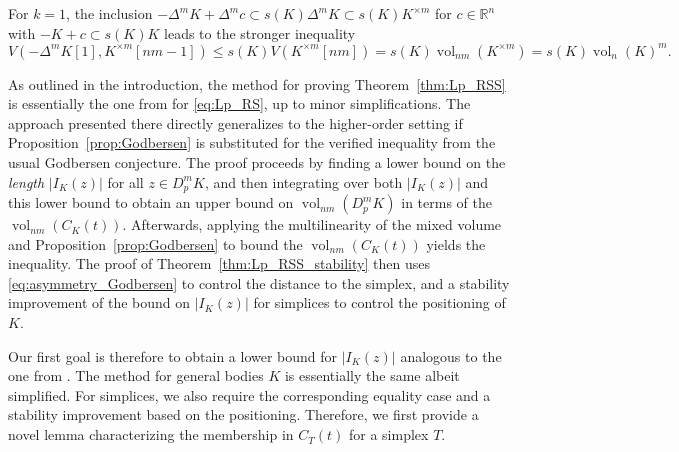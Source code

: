 \documentclass{amsart}
\newcommand{\cemph}[1]{\emph{\color{red}#1}}
\newcommand\R{\mathbb{R}}
\DeclareMathOperator{\vol}{vol}
\newcommand{\diff}[3]{D_{#1}^{#2} #3}
\newcommand{\diag}[2]{\Delta^{#1} #2}
\newcommand{\lyz}[4]{C_{#3} (#4)}
\newcommand{\interval}[4]{I_{#3} (#4)}
\newcommand{\cartesian}[2]{#1^{\times #2}}
\begin{document}
For $k = 1$, the inclusion $-\diag{m} K + \diag{m} c \subset s(K) \diag{m} K \subset s(K) \cartesian{K}{m}$ for $c \in \R^n$ with $-K + c \subset s(K) K$ leads to the stronger inequality
\begin{equation}\label{eq:asymmetry_Godbersen}
    V(-\diag{m} K[1], \cartesian{K}{m}[nm-1])
    \leq s(K) V(\cartesian{K}{m}[nm])
    = s(K) \vol_{nm}(\cartesian{K}{m})
    = s(K) \vol_n(K)^m.
\end{equation}

As outlined in the introduction, the method for proving Theorem~\ref{thm:Lp_RSS} is essentially the one from \cite{2026:KotrbatyMouamine} for \eqref{eq:Lp_RS},
up to minor simplifications.
The approach presented there directly generalizes to the higher-order setting if Proposition~\ref{prop:Godbersen} is substituted for the verified inequality from the usual Godbersen conjecture.
The proof proceeds by finding a lower bound on the \cemph{length} $|\interval{p}{m}{K}{z}|$ for all $z \in \diff{p}{m}{K}$, and then integrating over both $|\interval{p}{m}{K}{z}|$ and this lower bound to obtain an upper bound on
$\vol_{nm}(\diff{p}{m}{K})$ in terms of the $\vol_{nm}(\lyz{p}{m}{K}{t})$.
Afterwards, applying the multilinearity of the mixed volume and Proposition~\ref{prop:Godbersen} to bound the $\vol_{nm}(\lyz{p}{m}{K}{t})$ yields the inequality.
The proof of Theorem~\ref{thm:Lp_RSS_stability} then uses \eqref{eq:asymmetry_Godbersen} to control the distance to the simplex, and a stability improvement of the bound on $|\interval{p}{m}{K}{z}|$ for simplices to control the positioning of $K$.

Our first goal is therefore to obtain a lower bound for $|\interval{p}{m}{K}{z}|$ analogous to the one from \cite{2026:KotrbatyMouamine}.
The method for general bodies $K$ is essentially the same albeit simplified.
For simplices, we also require the corresponding equality case and a stability improvement based on the positioning.
Therefore, we first provide a novel lemma characterizing the membership in $\lyz{p}{m}{T}{t}$ for a simplex $T$.
\end{document}
